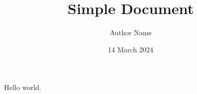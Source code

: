\documentclass{article}
\begin{document}
\title{Simple Document}
\author{Author Name}
\date{14 March 2024}
\maketitle

Hello world.
\end{document}

